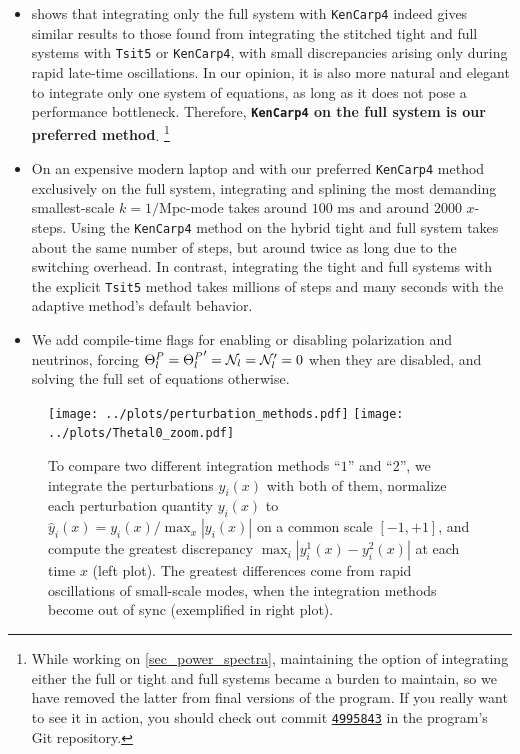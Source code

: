 \documentclass[10pt,a4paper]{article}
\begin{document}
\begin{itemize}
\item
{} shows that integrating only the full system with \texttt{KenCarp4}
indeed gives similar results to those found from integrating the stitched tight and full systems with \texttt{Tsit5} or \texttt{KenCarp4},
with small discrepancies arising only during rapid late-time oscillations.
In our opinion, it is also more natural and elegant to integrate only one system of equations,
as long as it does not pose a performance bottleneck.
Therefore, \textbf{\texttt{KenCarp4} on the full system is our preferred method}.%
\footnote{%
	While working on \cref{sec_power_spectra}, maintaining the option of integrating either the full or tight and full systems became a burden to maintain,
	so we have removed the latter from final versions of the program.
	If you really want to see it in action,
	you should check out commit \texttt{\href{https://github.com/hersle/AST5220-project/tree/4995843ac872425bc6b1d173dd171600164b74b9}{4995843}} in the program's Git repository.
}

\item
On an expensive modern laptop and with our preferred \texttt{KenCarp4} method exclusively on the full system,
integrating and splining the most demanding smallest-scale $k=1/\textrm{Mpc}$-mode
takes around $100 \textrm{ ms}$ and around $2000$ $x$-steps.
Using the \texttt{KenCarp4} method on the hybrid tight and full system takes about the same number of steps,
but around twice as long due to the switching overhead.
In contrast, integrating the tight and full systems with the explicit \texttt{Tsit5} method takes millions of steps and many seconds with the adaptive method's default behavior.

\item
We add compile-time flags for enabling or disabling polarization and neutrinos,
forcing $\Theta^P_l = {\Theta^P_l}^\prime = \mathcal{N}_l = \mathcal{N}_l^\prime = 0$ when they are disabled,
and solving the full set of equations otherwise.
\end{itemize}

\begin{figure}
\texttt{[image: ../plots/perturbation\_methods.pdf]}
\hfill
\texttt{[image: ../plots/Thetal0\_zoom.pdf]}
\caption{To compare two different integration methods ``$1$'' and ``$2$'',
we integrate the perturbations $y_i(x)$ with both of them,
normalize each perturbation quantity $y_i(x)$ to $\hat{y}_i(x) = y_i(x) / \max_x |y_i(x)|$ on a common scale $[-1, +1]$,
and compute the greatest discrepancy $\max_i |y^1_i(x) - y^2_i(x)|$ at each time $x$ (left plot).
The greatest differences come from rapid oscillations of small-scale modes, when the integration methods become out of sync (exemplified in right plot).}
\label{fig_perturb_methods}
\end{figure}
\end{document}
